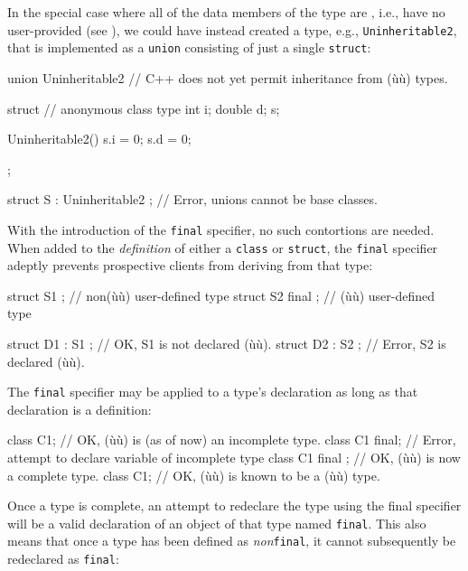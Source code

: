 {{In the special case where all of the data members of the type are
, i.e., have no user-provided  (see ), we could have
instead created a type, e.g., \lstinline!Uninheritable2!, that is
implemented as a \lstinline!union! consisting of just a single
\lstinline!struct!:

\begin{emcppslisting}
union Uninheritable2  // C++ does not yet permit inheritance from (ù{}ù) types.
{
    struct  // anonymous class type
    {
        int    i;
        double d;
    } s;

    Uninheritable2()
    {
       s.i = 0;
       s.d = 0;
    }
};

struct S : Uninheritable2 { };  // Error, unions cannot be base classes.
\end{emcppslisting}
    

\noindent With the introduction of the \lstinline!final! specifier, no such
contortions are needed. When added to the \emph{definition} of either a
\lstinline!class! or \lstinline!struct!, the \lstinline!final! specifier adeptly
prevents prospective clients from deriving from that type:

\begin{emcppslisting}
struct S1 { };        // non(ù{}ù) user-defined type
struct S2 final { };  // (ù{}ù) user-defined type

struct D1 : S1 { };   // OK, S1 is not declared (ù{}ù).
struct D2 : S2 { };   // Error, S2 is declared (ù{}ù).
\end{emcppslisting}
    

\noindent The \lstinline!final! specifier may be applied to a type's declaration as
long as that declaration is a definition:

\begin{emcppslisting}
class C1;            // OK,    (ù{}ù) is (as of now) an incomplete type.
class C1 final;      // Error, attempt to declare variable of incomplete type
class C1 final { };  // OK, (ù{}ù) is now a complete type.
class C1;            // OK, (ù{}ù) is known to be a (ù{}ù) type.
\end{emcppslisting}
    

\noindent Once a type is complete, an attempt to redeclare the type using the
final specifier will be a valid declaration of an object of that type
named \lstinline!final!. This also means that once a type has been defined
as \emph{non}\/\lstinline!final!, it cannot subsequently be redeclared as
\lstinline!final!:

}}

